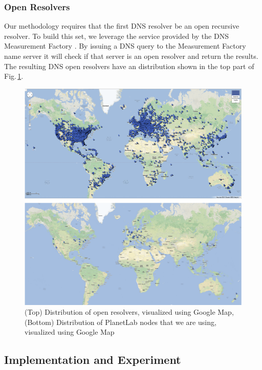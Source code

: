 \subsubsection{Open Resolvers}
Our methodology requires that the first DNS resolver be an open recursive resolver. To build this set, we leverage the service provided by the DNS Measurement Factory \cite{dnsfactory}. By issuing a DNS query to the Measurement Factory name server it will check if that server is an open resolver and return the results. The resulting DNS open resolvers have an distribution shown in the top part of Fig.\,\ref{fig:geo_viz}.

\begin{figure}
  \centering
  \includegraphics[width=\linewidth]{../figs/geo_viz.pdf}
  \vspace{-1em}
  \caption{(Top) Distribution of open resolvers, visualized using Google Map, (Bottom) Distribution of PlanetLab nodes that we are using, visualized using Google Map}
  \label{fig:geo_viz}
\end{figure}

\subsection{Implementation and Experiment}
\label{sec:impl-exper}

